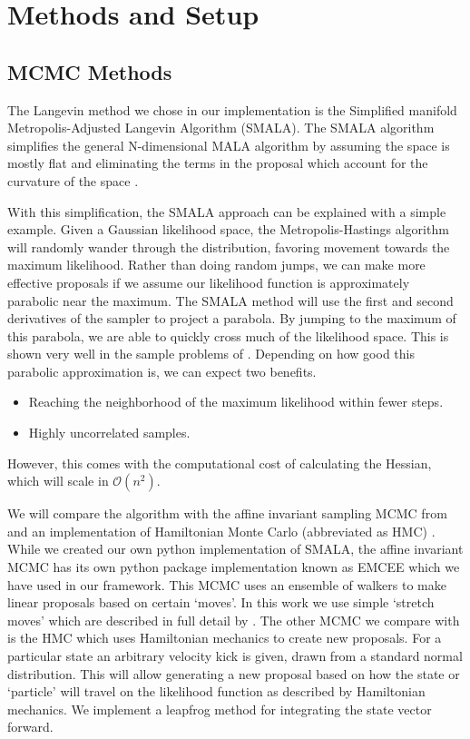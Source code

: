\documentclass{aa}
\begin{document}
\section{Methods and Setup}\label{setup}
\subsection{MCMC Methods}
The Langevin method we chose in our implementation is the Simplified manifold Metropolis-Adjusted Langevin Algorithm (SMALA). The SMALA algorithm simplifies the general N-dimensional MALA algorithm by assuming the space is mostly flat and eliminating the terms in the proposal which account for the curvature of the space \cite{Girolami2011}.

With this simplification, the SMALA approach can be explained with a simple example. Given a Gaussian likelihood space, the Metropolis-Hastings algorithm will randomly wander through the distribution, favoring movement towards the maximum likelihood.
Rather than doing random jumps, we can make more effective proposals if we assume our likelihood function is approximately parabolic near the maximum. The SMALA method will use the first and second derivatives of the sampler to project a parabola. By jumping to the maximum of this parabola, we are able to quickly cross much of the likelihood space. This is shown very well in the sample problems of \cite{Girolami2011}. Depending on how good this parabolic approximation is, we can expect two benefits.
\begin{itemize}
\item Reaching the neighborhood of the maximum likelihood within fewer steps.
\item Highly uncorrelated samples.
\end{itemize}
However, this comes with the computational cost of calculating the Hessian, which will scale in $\mathcal{O}(n^2)$.

We will compare the algorithm with the affine invariant sampling MCMC from \cite{Foreman-Mackey2013} and an implementation of Hamiltonian Monte Carlo (abbreviated as HMC) \citep{Duane1987}. While we created our own python implementation of SMALA, the affine invariant MCMC has its own python package implementation known as EMCEE which we have used in our framework. This MCMC uses an ensemble of walkers to make linear proposals based on certain `moves'. In this work we use simple `stretch moves' which are described in full detail by \cite{Foreman-Mackey2013}. The other MCMC we compare with is the HMC which uses Hamiltonian mechanics to create new proposals. For a particular state an arbitrary velocity kick is given, drawn from a standard normal distribution. This will allow generating a new proposal based on how the state or `particle' will travel on the likelihood function as described by Hamiltonian mechanics. We implement a leapfrog method for integrating the state vector forward.
\end{document}
